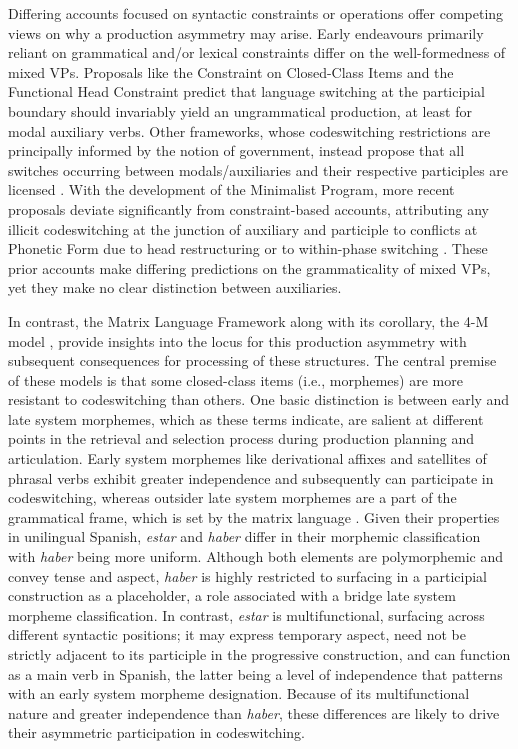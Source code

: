 \documentclass[output=paper,colorlinks,citecolor=brown]{langscibook}
\begin{document}
Differing accounts focused on syntactic constraints or operations offer competing views on why a production asymmetry may arise. Early endeavours primarily reliant on grammatical and/or lexical constraints differ on the well-formedness of mixed VPs. Proposals like the Constraint on Closed-Class Items \citep{Joshi1985} and the Functional Head Constraint \citep{Belazietal1994} predict that language switching at the participial boundary should invariably yield an ungrammatical production, at least for modal auxiliary verbs. Other frameworks, whose codeswitching restrictions are principally informed by the notion of government, instead propose that all switches occurring between modals/auxiliaries and their respective participles are licensed \citep{DiSciulloetal1986}. With the development of the Minimalist Program, more recent proposals deviate significantly from constraint-based accounts, attributing any illicit codeswitching at the junction of auxiliary and participle to conflicts at Phonetic Form due to head restructuring \citep{MacSwan2005,MacSwan2014} or to within-phase switching \citep{Lopezetal2017}. These prior accounts make differing predictions on the grammaticality of mixed VPs, yet they make no clear distinction between auxiliaries.

In contrast, the Matrix Language Framework along with its corollary, the 4-M model \citep{Myers-ScottonJake2017}, provide insights into the locus for this production asymmetry with subsequent consequences for processing of these structures. The central premise of these models is that some closed-class items (i.e., morphemes) are more resistant to codeswitching than others. One basic distinction is between early and late system morphemes, which as these terms indicate, are salient at different points in the retrieval and selection process during production planning and articulation. Early system morphemes like derivational affixes and satellites of phrasal verbs exhibit greater independence and subsequently can participate in codeswitching, whereas outsider late system morphemes are a part of the grammatical frame, which is set by the matrix language \citep{Myers-Scotton1993duelling,Myers-ScottonJake2001}. Given their properties in unilingual Spanish, \textit{estar} and \textit{haber} differ in their morphemic classification with \textit{haber} being more uniform. Although both elements are polymorphemic and convey tense and aspect, \textit{haber} is highly restricted to surfacing in a participial construction as a placeholder, a role associated with a bridge late system morpheme classification. In contrast, \textit{estar} is multifunctional, surfacing across different syntactic positions; it may express temporary aspect, need not be strictly adjacent to its participle in the progressive construction, and can function as a main verb in Spanish, the latter being a level of independence that patterns with an early system morpheme designation. Because of its multifunctional nature and greater independence than \textit{haber}, these differences are likely to drive their asymmetric participation in codeswitching.
\end{document}
